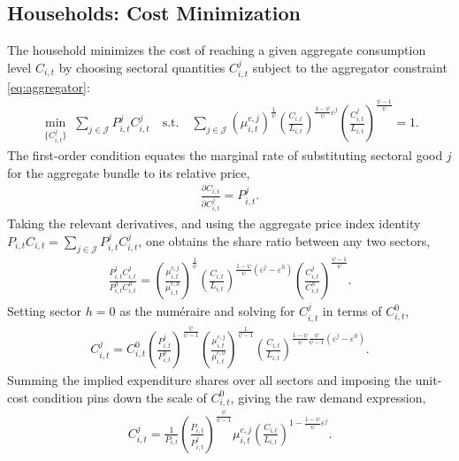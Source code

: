 \documentclass[10pt]{article}
\begin{document}
\subsection*{Households: Cost Minimization}
The household minimizes the cost of reaching a given aggregate consumption level
$C_{i,t}$ by choosing sectoral quantities $C^j_{i,t}$ subject to the aggregator
constraint \eqref{eq:aggregator}:
\begin{align}
  \min_{\{ C^j_{i,t} \}} \; \sum_{j \in \mathcal{J}} P^j_{i,t} C^j_{i,t}
  \quad \text{s.t.} \quad
  \sum_{j \in \mathcal{J}} \left(\mu^{c,j}_{i,t}\right)^{\frac{1}{\psi}}
  \left(\frac{C_{i,t}}{L_{i,t}}\right)^{\frac{1 - \psi}{\psi}\varepsilon^j}
  \left(\frac{C^j_{i,t}}{L_{i,t}}\right)^{\frac{\psi - 1}{\psi}} = 1. \label{eq:costmin}
\end{align}
The first-order condition equates the marginal rate of substituting sectoral good
$j$ for the aggregate bundle to its relative price,
\begin{align}
  \frac{\partial C_{i,t}}{\partial C^j_{i,t}} = P^j_{i,t}. \label{eq:foc}
\end{align}
Taking the relevant derivatives, and using the aggregate price index identity
$P_{i,t} C_{i,t} = \sum_{j \in \mathcal{J}} P^j_{i,t} C^j_{i,t}$, one obtains the
share ratio between any two sectors,
\begin{align}
  \frac{P^j_{i,t} C^j_{i,t}}{P^h_{i,t} C^h_{i,t}} =
  \left( \frac{\mu^{c,j}_{i,t}}{\mu^{c,h}_{i,t}} \right)^{\frac{1}{\psi}}
  \left( \frac{C_{i,t}}{L_{i,t}} \right)^{\frac{1 - \psi}{\psi} (\varepsilon^j - \varepsilon^h) }
  \left( \frac{C^j_{i,t}}{C^h_{i,t}} \right)^{\frac{\psi - 1}{\psi}}. \label{eq:ratio}
\end{align}
Setting sector $h = 0$ as the num\'eraire and solving for $C^j_{i,t}$ in terms of $C^{0}_{i,t}$,
\begin{align}
  C^j_{i,t} = C^{0}_{i,t} \left( \frac{P^j_{i,t}}{P^{0}_{i,t}} \right)^{\frac{\psi}{\psi - 1}}
  \left( \frac{\mu^{c,j}_{i,t}}{\mu^{c,0}_{i,t}} \right)^{\frac{1}{\psi - 1}}
  \left( \frac{C_{i,t}}{L_{i,t}} \right)^{\frac{1 - \psi}{\psi} \frac{\psi}{\psi - 1} (\varepsilon^j - \varepsilon^{0})}
  . \label{eq:solve1}
\end{align}
Summing the implied expenditure shares over all sectors and imposing the unit-cost
condition pins down the scale of $C^{0}_{i,t}$, giving the raw demand expression,
\begin{align}
  C^j_{i,t} = \frac{1}{P_{i,t}} \left( \frac{P_{i,t}}{P^j_{i,t}} \right)^{\frac{\psi}{\psi - 1}}
  \mu^{c,j}_{i,t} \left( \frac{C_{i,t}}{L_{i,t}} \right)^{1 - \frac{1 - \psi}{\psi} \varepsilon^j}
  . \label{eq:demand-raw}
\end{align}
\end{document}

